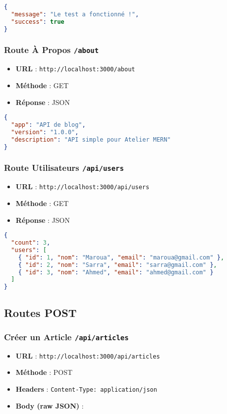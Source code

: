 \documentclass[12pt,a4paper]{article}
\begin{document}
\begin{lstlisting}[language=json]
{
  "message": "Le test a fonctionné !",
  "success": true
}
\end{lstlisting}

\subsubsection{Route À Propos \texttt{/about}}
\begin{itemize}
    \item \textbf{URL} : \texttt{http://localhost:3000/about}
    \item \textbf{Méthode} : GET
    \item \textbf{Réponse} : JSON
\end{itemize}

\begin{lstlisting}[language=json]
{
  "app": "API de blog",
  "version": "1.0.0",
  "description": "API simple pour Atelier MERN"
}
\end{lstlisting}

\subsubsection{Route Utilisateurs \texttt{/api/users}}
\begin{itemize}
    \item \textbf{URL} : \texttt{http://localhost:3000/api/users}
    \item \textbf{Méthode} : GET
    \item \textbf{Réponse} : JSON
\end{itemize}

\begin{lstlisting}[language=json]
{
  "count": 3,
  "users": [
    { "id": 1, "nom": "Maroua", "email": "maroua@gmail.com" },
    { "id": 2, "nom": "Sarra", "email": "sarra@gmail.com" },
    { "id": 3, "nom": "Ahmed", "email": "ahmed@gmail.com" }
  ]
}
\end{lstlisting}

\subsection{Routes POST}

\subsubsection{Créer un Article \texttt{/api/articles}}
\begin{itemize}
    \item \textbf{URL} : \texttt{http://localhost:3000/api/articles}
    \item \textbf{Méthode} : POST
    \item \textbf{Headers} : \texttt{Content-Type: application/json}
    \item \textbf{Body (raw JSON)} :
\end{itemize}
\end{document}
